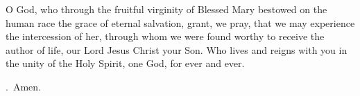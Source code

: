 \lettrine[lines=3]{O}{} God, who through the fruitful virginity of Blessed Mary
bestowed on the human race
the grace of eternal salvation,
grant, we pray,
that we may experience the intercession of her,
through whom we were found worthy
to receive the author of life,
our Lord Jesus Christ your Son.
Who lives and reigns with you in the unity of the Holy Spirit,
one God, for ever and ever. \par \Rbar.~Amen. 
